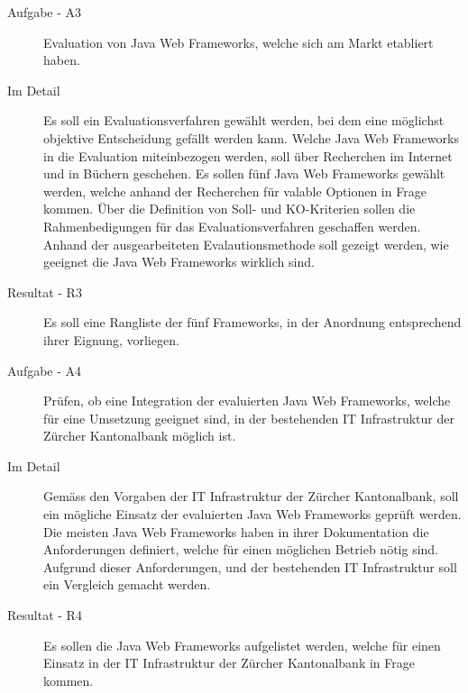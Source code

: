   \begin{description}
    \item[Aufgabe - A3\label{itm:Aufgabe-03}]
    \begin{itshape}Evaluation von Java Web Frameworks, welche sich am Markt
    etabliert haben.\end{itshape}
    \item[Im Detail\label{itm:Detail-03}]
    Es soll ein Evaluationsverfahren gewählt werden, bei dem eine möglichst
    objektive Entscheidung gefällt werden kann. Welche Java Web Frameworks in
    die Evaluation miteinbezogen werden, soll über Recherchen im Internet und in
    Büchern geschehen. Es sollen fünf Java Web Frameworks gewählt werden, welche
    anhand der Recherchen für valable Optionen in Frage kommen. Über die
    Definition von Soll- und KO-Kriterien sollen die Rahmenbedigungen für das
    Evaluationsverfahren geschaffen werden. Anhand der ausgearbeiteten
    Evalautionsmethode soll gezeigt werden, wie geeignet die Java Web Frameworks
    wirklich sind.
    \item[Resultat - R3\label{itm:Resultat-03}]
    Es soll eine Rangliste der fünf Frameworks, in der Anordnung entsprechend
    ihrer Eignung, vorliegen.
  \end{description}
  
  \begin{description}
    \item[Aufgabe - A4\label{itm:Aufgabe-04}]
    \begin{itshape}Prüfen, ob eine Integration der evaluierten Java Web
    Frameworks, welche für eine Umsetzung geeignet sind, in der bestehenden IT
    Infrastruktur der Zürcher Kantonalbank möglich ist.\end{itshape}
    \item[Im Detail\label{itm:Detail-04}]
    Gemäss den Vorgaben der IT Infrastruktur der Zürcher Kantonalbank, soll ein
    mögliche Einsatz der evaluierten Java Web Frameworks geprüft werden. Die
    meisten Java Web Frameworks haben in ihrer Dokumentation die Anforderungen
    definiert, welche für einen möglichen Betrieb nötig sind. Aufgrund dieser
    Anforderungen, und der bestehenden IT Infrastruktur soll ein Vergleich
    gemacht werden.
    \item[Resultat - R4\label{itm:Resultat-04}]
    Es sollen die Java Web Frameworks aufgelistet werden, welche für einen
    Einsatz in der IT Infrastruktur der Zürcher Kantonalbank in Frage kommen.
  \end{description}
  

